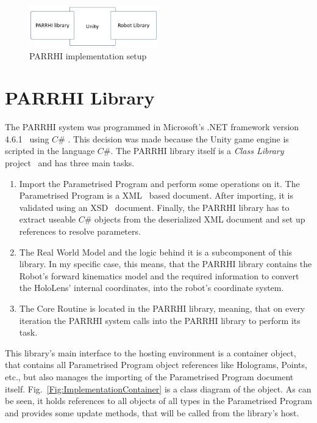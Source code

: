 \begin{figure}[!h]
	\centering
	\includegraphics[width=0.5\textwidth]{Figures/Implementation_SystemSetup.jpg}
	\caption{PARRHI implementation setup}
	\label{Fig:Implementation}
\end{figure}

\section{PARRHI Library}
The PARRHI system was programmed in Microsoft's .NET framework version 4.6.1~\cite{NETFramework} using $C\#$ \cite{CSharp}. This decision was made because the Unity game engine is scripted in the language $C\#$. The PARRHI library itself is a \textit{Class Library} project~\cite{ClassLibrary} and has three main tasks.

\begin{enumerate}
	\item Import the Parametrised Program and perform some operations on it. The Parametrised Program is a XML~\cite{xmlW3C} based document. After importing, it is validated using an XSD~\cite{xsdW3C} document. Finally, the PARRHI library has to extract useable $C\#$ objects from the deserialized XML document and set up references to resolve parameters.
	\item The Real World Model and the logic behind it is a subcomponent of this library. In my specific case, this means, that the PARRHI library contains the Robot's forward kinematics model and the required information to convert the HoloLens' internal coordinates, into the robot's coordinate system.
	\item The Core Routine is located in the PARRHI library, meaning, that on every iteration the PARRHI system calls into the PARRHI library to perform its task.
\end{enumerate}

This library's main interface to the hosting environment is a container object, that contains all Parametrised Program object references like Holograms, Points, etc., but also manages the importing of the Parametrised Program document itself. Fig.~\ref{Fig:ImplementationContainer} is a class diagram of the  object. As can be seen, it holds references to all objects of all types in the Parametrised Program and provides some update methods, that will be called from the library's host.

